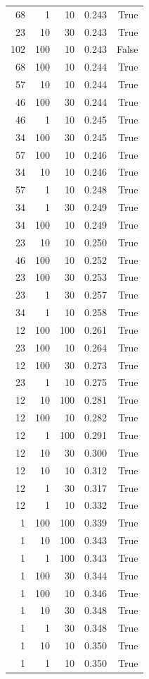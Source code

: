\begin{tabular}{rrrrr}
68 & 1 & 10 & 0.243 & True \\
23 & 10 & 30 & 0.243 & True \\
102 & 100 & 10 & 0.243 & False \\
68 & 100 & 10 & 0.244 & True \\
57 & 10 & 10 & 0.244 & True \\
46 & 100 & 30 & 0.244 & True \\
46 & 1 & 10 & 0.245 & True \\
34 & 100 & 30 & 0.245 & True \\
57 & 100 & 10 & 0.246 & True \\
34 & 10 & 10 & 0.246 & True \\
57 & 1 & 10 & 0.248 & True \\
34 & 1 & 30 & 0.249 & True \\
34 & 100 & 10 & 0.249 & True \\
23 & 10 & 10 & 0.250 & True \\
46 & 100 & 10 & 0.252 & True \\
23 & 100 & 30 & 0.253 & True \\
23 & 1 & 30 & 0.257 & True \\
34 & 1 & 10 & 0.258 & True \\
12 & 100 & 100 & 0.261 & True \\
23 & 100 & 10 & 0.264 & True \\
12 & 100 & 30 & 0.273 & True \\
23 & 1 & 10 & 0.275 & True \\
12 & 10 & 100 & 0.281 & True \\
12 & 100 & 10 & 0.282 & True \\
12 & 1 & 100 & 0.291 & True \\
12 & 10 & 30 & 0.300 & True \\
12 & 10 & 10 & 0.312 & True \\
12 & 1 & 30 & 0.317 & True \\
12 & 1 & 10 & 0.332 & True \\
1 & 100 & 100 & 0.339 & True \\
1 & 10 & 100 & 0.343 & True \\
1 & 1 & 100 & 0.343 & True \\
1 & 100 & 30 & 0.344 & True \\
1 & 100 & 10 & 0.346 & True \\
1 & 10 & 30 & 0.348 & True \\
1 & 1 & 30 & 0.348 & True \\
1 & 10 & 10 & 0.350 & True \\
1 & 1 & 10 & 0.350 & True \\
\bottomrule
\end{tabular}
